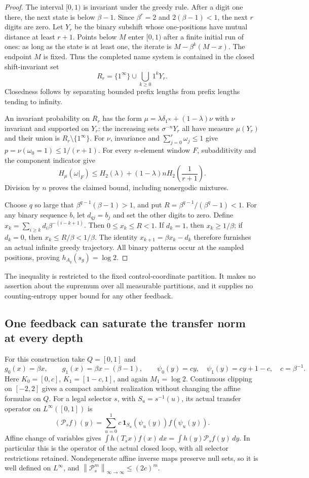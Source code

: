 \documentclass[11pt,reqno]{amsart}
\numberwithin{equation}{section}
\theoremstyle{definition}
\newcommand{\one}{\mathbf 1}
\newcommand{\opnorm}[1]{\left\|#1\right\|_{\infty\to\infty}}
\begin{document}
\begin{proof}
The interval $[0,1)$ is invariant under the greedy rule.
After a digit one there, the next state is below $\beta-1$.
Since $\beta^r=2$ and $2(\beta-1)<1$, the next $r$ digits
are zero. Let $Y_r$ be the binary subshift whose one-positions
have mutual distance at least $r+1$. Points below $M$ enter
$[0,1)$ after a finite initial run of ones: as long as the
state is at least one, the iterate is
$M-\beta^k(M-x)$. The endpoint $M$ is fixed. Thus the
completed name system is contained in the closed shift-invariant set
\[
 R_r=\{1^\infty\}\cup\bigcup_{k\ge0}1^kY_r.
\]
Closedness follows by separating bounded prefix lengths from
prefix lengths tending to infinity.

An invariant probability on $R_r$ has the form
$\mu=\lambda\delta_{1^\infty}+(1-\lambda)\nu$ with $\nu$
invariant and supported on $Y_r$: the increasing sets
$\sigma^{-n}Y_r$ all have measure $\mu(Y_r)$ and their union
is $R_r\setminus\{1^\infty\}$.
For $\nu$, invariance and $\sum_{j=0}^r\omega_j\le1$ give
$p=\nu(\omega_0=1)\le1/(r+1)$. For every $n$-element window $F$,
subadditivity and the component indicator give
\[
 H_\mu(\omega|_F)
 \le H_2(\lambda)+(1-\lambda)nH_2\left(\frac1{r+1}\right).
\]
Division by $n$ proves the claimed bound, including
nonergodic mixtures.

Choose $q$ so large that
$\beta^{q-1}(\beta-1)>1$, and put
$R=\beta^{q-1}/(\beta^q-1)<1$.
For any binary sequence $b$, let $d_{qj}=b_j$ and set the
other digits to zero. Define
$x_k=\sum_{i\ge k}d_i\beta^{-(i-k+1)}$.
Then $0\le x_k\le R<1$.
If $d_k=1$, then $x_k\ge1/\beta$; if $d_k=0$, then
$x_k\le R/\beta<1/\beta$.
The identity $x_{k+1}=\beta x_k-d_k$ therefore furnishes an
actual infinite greedy trajectory. All binary patterns occur
at the sampled positions, proving $h_{A_q}(s_g)=\log2$.
\end{proof}

The inequality is restricted to the fixed control-coordinate
partition. It makes no assertion about the supremum over all
measurable partitions, and it supplies no counting-entropy upper
bound for any other feedback.

\subsection{One feedback can saturate the transfer norm at every depth}

For this construction take $Q=[0,1]$ and
\[
 g_0(x)=\beta x,\qquad g_1(x)=\beta x-(\beta-1),\qquad
 \psi_0(y)=cy,\quad\psi_1(y)=cy+1-c,\quad c=\beta^{-1}.
\]
Here $K_0=[0,c]$, $K_1=[1-c,1]$, and again $M_1=\log2$. Continuous clipping on $[-2,2]$ gives a compact ambient realization without changing the affine formulas on $Q$.
For a legal selector $s$, with $S_u=s^{-1}(u)$, its actual
transfer operator on $L^\infty([0,1])$ is
\[
 (\mathcal P_sf)(y)=
 \sum_{u=0}^1c\,\one_{S_u}(\psi_u(y))f(\psi_u(y)).
\]
Affine change of variables gives
$\int h(T_sx)f(x)\,dx=\int h(y)\mathcal P_sf(y)\,dy$.
In particular this is the operator of the actual closed loop,
with all selector restrictions retained. Nondegenerate affine inverse maps preserve null sets, so it is well defined on $L^\infty$, and
$\opnorm{\mathcal P_s^m}\le(2c)^m$.
\end{document}
